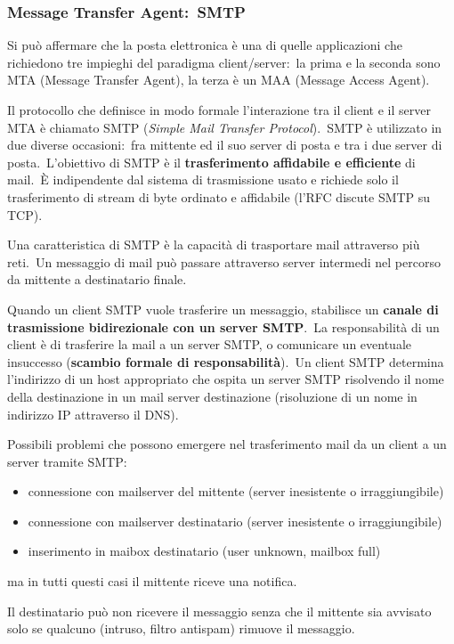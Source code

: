 \subsubsection{Message Transfer Agent:\ SMTP}

Si può affermare che la posta elettronica è una di quelle applicazioni che richiedono tre impieghi del paradigma client/server:\ la prima e la seconda sono MTA (Message Transfer Agent), la terza è un MAA (Message Access Agent).

Il protocollo che definisce in modo formale l'interazione tra il client e il server MTA è chiamato SMTP (\emph{Simple Mail Transfer Protocol}).\
SMTP è utilizzato in due diverse occasioni:\ fra mittente ed il suo server di posta e tra i due server di posta.\
L'obiettivo di SMTP è il \textbf{trasferimento affidabile e efficiente} di mail.\
È indipendente dal sistema di trasmissione usato e richiede solo il trasferimento di stream di byte ordinato e affidabile (l'RFC discute SMTP su TCP).

Una caratteristica di SMTP è la capacità di trasportare mail attraverso più reti.\
Un messaggio di mail può passare attraverso server intermedi nel percorso da mittente a destinatario finale.

Quando un client SMTP vuole trasferire un messaggio, stabilisce un \textbf{canale di trasmissione bidirezionale con un server SMTP}.\
La responsabilità di un client è di trasferire la mail a un server SMTP, o comunicare un eventuale insuccesso (\textbf{scambio formale di responsabilità}).\
Un client SMTP determina l'indirizzo di un host appropriato che ospita un server SMTP risolvendo il nome della destinazione in un mail server destinazione (risoluzione di un nome in indirizzo IP attraverso il DNS).

Possibili problemi che possono emergere nel trasferimento mail da un client a un server tramite SMTP:
\begin{itemize}
    \item connessione con mailserver del mittente (server inesistente o irraggiungibile)
    \item connessione con mailserver destinatario (server inesistente o irraggiungibile)
    \item inserimento in maibox destinatario (user unknown, mailbox full)
\end{itemize}
ma in tutti questi casi il mittente riceve una notifica.

Il destinatario può non ricevere il messaggio senza che il mittente sia avvisato solo se qualcuno (intruso, filtro antispam) rimuove il messaggio.


